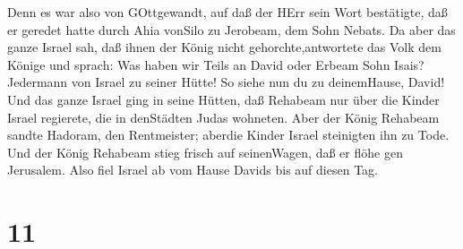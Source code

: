 Denn es war also von GOttgewandt, auf daß der HErr sein Wort bestätigte,
daß er geredet hatte durch Ahia vonSilo zu Jerobeam, dem Sohn Nebats.
 Da aber das ganze Israel sah, daß ihnen der König nicht
gehorchte,antwortete das Volk dem Könige und sprach: Was haben wir Teils
an David oder Erbeam Sohn Isais? Jedermann von Israel zu seiner Hütte!
So siehe nun du zu deinemHause, David! Und das ganze Israel ging in
seine Hütten,  daß Rehabeam nur über die Kinder Israel
regierete, die in denStädten Judas wohneten.  Aber der
König Rehabeam sandte Hadoram, den Rentmeister; aberdie Kinder Israel
steinigten ihn zu Tode. Und der König Rehabeam stieg frisch auf
seinenWagen, daß er flöhe gen Jerusalem.  Also fiel Israel
ab vom Hause Davids bis auf diesen Tag.

\hypertarget{section-10}{%
\section{11}\label{section-10}}

